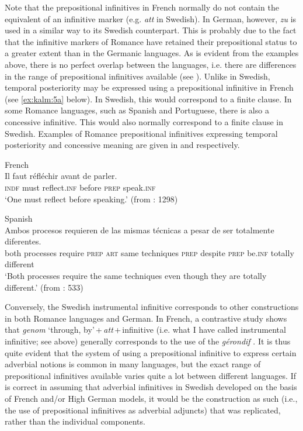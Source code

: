 \documentclass[output=paper]{langscibook}
\begin{document}
Note that the prepositional infinitives in French normally do not contain the equivalent of an infinitive marker (e.g. \textit{att} in Swedish). In German, however, \textit{zu} is used in a similar way to its Swedish counterpart. This is probably due to the fact that the infinitive markers of Romance have retained their prepositional status to a greater extent than in the Germanic languages. As is evident from the examples above, there is no perfect overlap between the languages, i.e. there are differences in the range of prepositional infinitives available (see \citealt{Hengenveld1998}). Unlike in Swedish, temporal posteriority may be expressed using a prepositional infinitive in French (see \ref{ex:kalm:5a} below). In Swedish, this would correspond to a finite clause. In some Romance languages, such as Spanish and Portuguese, there is also a concessive infinitive. This would also normally correspond to a finite clause in Swedish. Examples of Romance prepositional infinitives expressing temporal posteriority and concessive meaning are given in  and  respectively. 


\ea
\label{ex:kalm:5}
\ea French\label{ex:kalm:5a}\\ 
\gll Il faut réfléchir avant de parler.\\
\textsc{indf} must reflect.\textsc{inf} before \textsc{prep} speak.\textsc{inf}\\
\glt ‘One must reflect before speaking.’ (from \citealt{Grevisse1993}: 1298) 

\ex Spanish\label{ex:kalm:5b}\\ 
\gll Ambos procesos requieren de las mismas técnicas a pesar de ser totalmente diferentes.\\
both processes require \textsc{prep} \textsc{art} same techniques \textsc{prep} despite \textsc{prep} be.\textsc{inf} totally different\\
\glt ‘Both processes require the same techniques even though they are totally different.’ (from \citealt{Schulte2007What}: 533)
\z 
\z 



Conversely, the Swedish instrumental infinitive corresponds to other constructions in both Romance languages and German. In French, a contrastive study shows that \textit{genom} ‘through, by’\,+\,\textit{att}\,+\,infinitive (i.e. what I have called instrumental infinitive; see  above) generally corresponds to the use of the \textit{gérondif} \citep[128]{Hellqvist2015}. It is thus quite evident that the system of using a prepositional infinitive to express certain adverbial notions is common in many languages, but the exact range of prepositional infinitives available varies quite a lot between different languages. If \citet{Holm1967} is correct in assuming that adverbial infinitives in Swedish developed on the basis of French and/or High German models, it would be the construction as such (i.e., the use of prepositional infinitives as adverbial adjuncts) that was replicated, rather than the individual components. 
\end{document}
